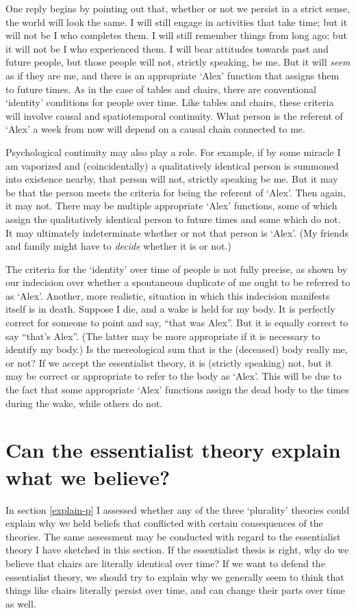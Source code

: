 \documentclass[11pt]{article}
\begin{document}
\begin{spacing}{1.5}
One reply begins by pointing out that, whether or not we persist in a
strict sense, the world will look the same.  I will still engage in
activities that take time; but it will not be I who completes them.  I
will still remember things from long ago; but it will not be I who
experienced them.  I will bear attitudes towards past and future
people, but those people will not, strictly speaking, be me.  But it
will {\em seem} as if they are me, and there is an appropriate `Alex'
function that assigns them to future times.  As in the case of tables
and chairs, there are conventional `identity' conditions for people
over time.  Like tables and chairs, these criteria will involve causal
and spatiotemporal continuity.  What person is the referent of `Alex'
a week from now will depend on a causal chain connected to me.

Psychological continuity may also play a role.  For example, if by
some miracle I am vaporized and (coincidentally) a qualitatively
identical person is summoned into existence nearby, that person will
not, strictly speaking be me.  But it may be that the person meets the
criteria for being the referent of `Alex'.  Then again, it may not.
There may be multiple appropriate `Alex' functions, some of which
assign the qualitatively identical person to future times and some
which do not.  It may ultimately indeterminate whether or not that
person is `Alex'.  (My friends and family might have to {\em decide}
whether it is or not.)

The criteria for the `identity' over time of people is not fully
precise, as shown by our indecision over whether a spontaneous
duplicate of me ought to be referred to as `Alex'.  Another, more
realistic, situation in which this indecision manifests itself is in
death.  Suppose I die, and a wake is held for my body.  It is
perfectly correct for someone to point and say, ``that was Alex''.
But it is equally correct to say ``that's Alex''.  (The latter may be
more appropriate if it is necessary to identify my body.)  Is the
mereological sum that is the (deceased) body really me, or not?  If we
accept the essentialist theory, it is (strictly speaking) not, but it
may be correct or appropriate to refer to the body as `Alex'.  This
will be due to the fact that some appropriate `Alex' functions assign
the dead body to the times during the wake, while others do not.

\section{Can the essentialist theory explain what we believe?}
\label{explain-e}
In section \ref{explain-p} I assessed whether any of the three
`plurality' theories could explain why we held beliefs that conflicted
with certain consequences of the theories.  The same assessment may
be conducted with regard to the essentialist theory I have sketched in
this section.  If the essentialist thesis is right, why do we believe
that chairs are literally identical over time?  If we want to defend
the essentialist theory, we should try to explain why we generally
seem to think that things like chairs literally persist over time, and
can change their parts over time as well.


\end{spacing}
\end{document}

